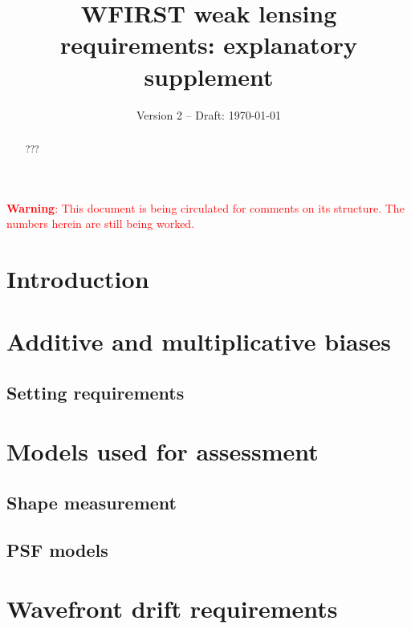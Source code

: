 \documentclass[preprint]{aastex}
\newcommand{\CMH}[1]{{\textcolor{red}{#1}}}
\begin{document}
\title{WFIRST weak lensing requirements: explanatory supplement}

\date{Version 2 -- Draft: \today}


\begin{abstract}
???
\end{abstract}


\tableofcontents

\CMH{{\bfseries Warning}: This document is being circulated for comments on its structure. The numbers herein are still being worked.}

\section{Introduction}
\label{sec:intro}


\section{Additive and multiplicative biases}
\label{sec:add_mult}



\subsection{Setting requirements}



\section{Models used for assessment}



\subsection{Shape measurement}
\label{ss:shape}



\subsection{PSF models}
\label{ss:PSF}



\section{Wavefront drift requirements}
\label{sec:drift}
\end{document}

